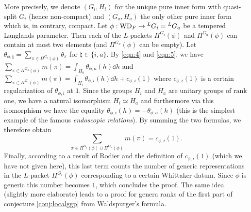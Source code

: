 More precisely, we denote $(G_i, H_i)$ for the unique pure inner form with quasi-split $G_i$ (hence non-compact) and $(G_a, H_a)$ the only other pure inner form which is, in contrary, compact.
Let $\phi: \mathrm{WD}_F \to {}^L G_i = {}^L G_a$ be a tempered Langlands parameter.
Then each of the $L$-packets $\Pi^{G_i}(\phi)$ and $\Pi^{G_a}(\phi)$ can contain at most two elements (and $\Pi^{G_a}(\phi)$ can be empty).
Let $\theta_{\phi, \natural} = \sum_{\pi \in \Pi^{G_\natural}(\phi)}\theta_\pi$ for $\natural \in \{i, a\}$.
By \eqref{eqn:4} and \eqref{eqn:5}, we have $\sum_{\pi \in \Pi^{G_a}(\phi)} m(\pi) = \int_{H_a} \theta_{\phi, a}(h) \dd h$ and $\sum_{\pi \in \Pi^{G_i}(\phi)} m(\pi) = \int_{H_i} \theta_{\phi, i}(h) \dd h + c_{\phi, i}(1)$ where $c_{\phi, i}(1)$ is a certain regularization of $\theta_{\phi, i}$ at $1$.
Since the groups $H_i$ and $H_a$ are unitary groups of rank one, we have a natural isomorphism $H_i \simeq H_a$ and furthermore via this isomorphism we have the equality $\theta_{\phi, i}(h) = -\theta_{\phi, a}(h)$ (this is the simplest example of the famous \emph{endoscopic relations}).
By summing the two formulas, we therefore obtain
\[
    \sum_{\pi \in \Pi^{G_i}(\phi) \cup \Pi^{G_a}(\phi)} m(\pi) = c_{\phi, i}(1).
\]
Finally, according to a result of Rodier \cite{rodier2006modele} and the definition of $c_{\phi, i}(1)$ (which we have not given here), this last term counts the number of generic representations in the $L$-packet $\Pi^{G_i}(\phi)$ corresponding to a certain Whittaker datum.
Since $\phi$ is generic this number becomes $1$, which concludes the proof.
The same idea (slightly more elaborate) leads to a proof for genera ranks of the first part of conjecture \ref{conj:localggp} from Waldspurger's formula.

